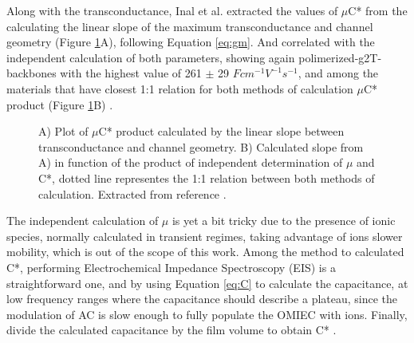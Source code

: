 Along with the transconductance, Inal et al. extracted the values of $\mu$C* from the calculating the linear slope of the maximum transconductance and channel geometry (Figure \ref{fig:gmuc}A), following Equation \ref{eq:gm}. And correlated with the independent calculation of both parameters, showing again polimerized-g2T-backbones with the highest value of 261 $\pm$ 29 $Fcm^{-1}V^{-1}s^{-1}$,   and among the materials that have closest 1:1 relation for both methods of calculation $\mu$C* product (Figure \ref{fig:gmuc}B) \cite{inalBenchmarkingOrganicMixed2017}.
 
 \begin{figure}[h]
 	\centering
 	\hspace{2em}
 	\caption[OECTs benchmark with different OMIECs]{A) Plot of $\mu$C* product calculated by the linear slope between transconductance and channel geometry. B) Calculated slope from A) in function of the product of independent determination of $\mu$ and C*, dotted line representes the 1:1 relation between both methods of calculation. Extracted from reference %
 		\cite{inalBenchmarkingOrganicMixed2017}.}
 	\label{fig:gmuc}
 \end{figure}

The independent calculation of $\mu$ is yet a bit tricky due to the presence of ionic species, normally calculated in transient regimes, taking advantage of ions slower mobility, which is out of the scope of this work. Among the method to calculated C*, performing Electrochemical Impedance Spectroscopy (EIS) is a straightforward one, and by using Equation \ref{eq:C} to calculate the capacitance, at low frequency ranges where the capacitance should describe a plateau, since the modulation of AC is slow enough to fully populate the OMIEC with ions. Finally, divide the calculated capacitance by the film volume to obtain C*%
 \cite{ohayonGuideCharacterizationOrganic2023}.

